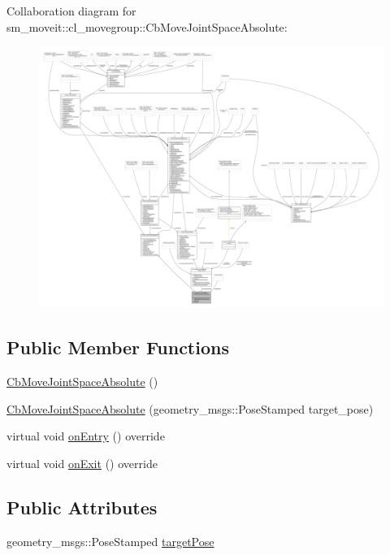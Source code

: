 Collaboration diagram for sm\+\_\+moveit\+:\+:cl\+\_\+movegroup\+:\+:Cb\+Move\+Joint\+Space\+Absolute\+:
\nopagebreak
\begin{figure}[H]
\begin{center}
\leavevmode
\includegraphics[width=350pt]{classsm__moveit_1_1cl__movegroup_1_1CbMoveJointSpaceAbsolute__coll__graph}
\end{center}
\end{figure}
\subsection*{Public Member Functions}
\begin{DoxyCompactItemize}
\item 
\hyperlink{classsm__moveit_1_1cl__movegroup_1_1CbMoveJointSpaceAbsolute_a120deb06f8397d997f925fc968999884}{Cb\+Move\+Joint\+Space\+Absolute} ()
\item 
\hyperlink{classsm__moveit_1_1cl__movegroup_1_1CbMoveJointSpaceAbsolute_a1df38b938a78881f4e83321e60c57a53}{Cb\+Move\+Joint\+Space\+Absolute} (geometry\+\_\+msgs\+::\+Pose\+Stamped target\+\_\+pose)
\item 
virtual void \hyperlink{classsm__moveit_1_1cl__movegroup_1_1CbMoveJointSpaceAbsolute_acd91b1472942f375a4dc420eddd7e807}{on\+Entry} () override
\item 
virtual void \hyperlink{classsm__moveit_1_1cl__movegroup_1_1CbMoveJointSpaceAbsolute_a4fdc00eed8e57c8bf826ec9ad4191e02}{on\+Exit} () override
\end{DoxyCompactItemize}
\subsection*{Public Attributes}
\begin{DoxyCompactItemize}
\item 
geometry\+\_\+msgs\+::\+Pose\+Stamped \hyperlink{classsm__moveit_1_1cl__movegroup_1_1CbMoveJointSpaceAbsolute_a53f44681ff7043d4d059ded154a9fbb3}{target\+Pose}
\end{DoxyCompactItemize}
